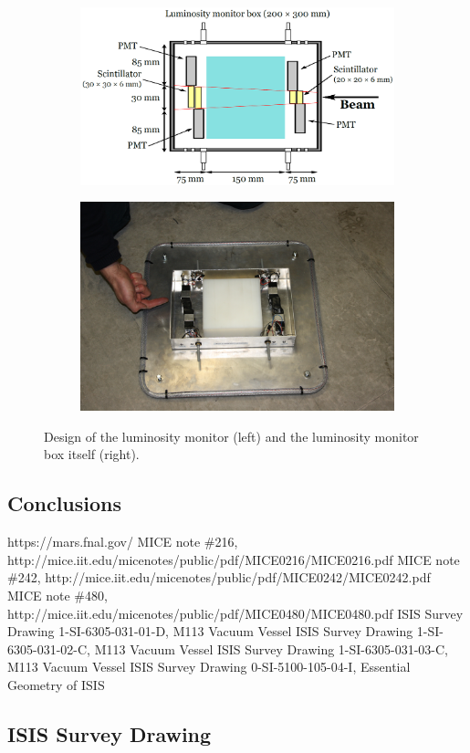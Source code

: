 \documentclass[a4paper,11pt]{article}
\begin{document}
\begin{figure}
  \begin{center}
  \begin{subfigure}
  \centering
    \includegraphics[width=0.59\columnwidth]{./figures/LM2.png}
  \end{subfigure}
  \begin{subfigure}
  \centering
    \includegraphics[width=0.39\columnwidth]{./figures/LM3.jpg}
  \end{subfigure}
  \caption{Design of the luminosity monitor (left) and the luminosity monitor box itself (right).}
  \label{fig:LM2}
  \end{center}
\end{figure}

\section{Conclusions}

\begin{thebibliography}{9}
 https://mars.fnal.gov/
 MICE note \#216, http://mice.iit.edu/micenotes/public/pdf/MICE0216/MICE0216.pdf
 MICE note \#242, http://mice.iit.edu/micenotes/public/pdf/MICE0242/MICE0242.pdf
 MICE note \#480, http://mice.iit.edu/micenotes/public/pdf/MICE0480/MICE0480.pdf
 ISIS Survey Drawing 1-SI-6305-031-01-D, M113 Vacuum Vessel
 ISIS Survey Drawing 1-SI-6305-031-02-C, M113 Vacuum Vessel
 ISIS Survey Drawing 1-SI-6305-031-03-C, M113 Vacuum Vessel
 ISIS Survey Drawing 0-SI-5100-105-04-I, Essential Geometry of ISIS

\end{thebibliography}

\begin{appendices}
\chapter{ISIS Survey Drawing}






\end{appendices}
\end{document}

